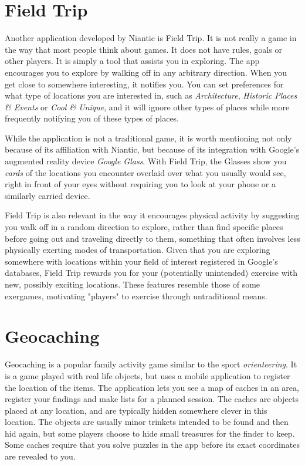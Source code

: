 \section{Field Trip}

Another application developed by Niantic is Field Trip. It is not really a game in the way that most people think about games. It does not have rules, goals or other players. It is simply a tool that assists you in exploring. The app encourages you to explore by walking off in any arbitrary direction. When you get close to somewhere interesting, it notifies you. You can set preferences for what type of locations you are interested in, such as \emph{Architecture}, \emph{Historic Places \& Events} or \emph{Cool \& Unique}, and it will ignore other types of places while more frequently notifying you of these types of places.

While the application is not a traditional game, it is worth mentioning not only because of its affiliation with Niantic, but because of its integration with Google's augmented reality device \emph{Google Glass}. With Field Trip, the Glasses show you \emph{cards} of the locations you encounter overlaid over what you usually would see, right in front of your eyes without requiring you to look at your phone or a similarly carried device.

Field Trip is also relevant in the way it encourages physical activity by suggesting you walk off in a random direction to explore, rather than find specific places before going out and traveling directly to them, something that often involves less physically exerting modes of transportation. Given that you are exploring somewhere with locations within your field of interest registered in Google's databases, Field Trip rewards you for your (potentially unintended) exercise with new, possibly exciting locations. These features resemble those of some exergames, motivating "players" to exercise through untraditional means.

\section{Geocaching}

Geocaching is a popular family activity game similar to the sport \emph{orienteering}. It is a game played with real life objects, but uses a mobile application to register the location of the items. The application lets you see a map of caches in an area, register your findings and make lists for a planned session. The caches are objects placed at any location, and are typically hidden somewhere clever in this location. The objects are usually minor trinkets intended to be found and then hid again, but some players choose to hide small treasures for the finder to keep. Some caches require that you solve puzzles in the app before its exact coordinates are revealed to you.

